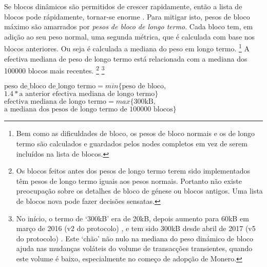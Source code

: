 Se blocos dinâmicos são permitidos de crescer rapidamente, então a lista de blocos pode rápidamente, tornar-se enorme \cite{big-bang-github}. Para mitigar isto, pesos de bloco máximo são amarrados por {\em pesos de bloco de longo termo}. Cada bloco tem, em adição ao seu peso normal, uma segunda métrica, que é calculada com base nos blocos anteriores. Ou seja é calculada a mediana do peso em longo termo.       
\footnote{Bem como as dificuldades de bloco, os pesos de bloco normais e os de longo termo são calculados e guardados pelos nodes completos em vez de serem incluídos na lista de blocos.}
A efectiva mediana de peso de longo termo está relacionada com a mediana dos 100000 blocos mais recentes. 
\footnote{Os blocos feitos antes dos pesos de longo termo terem sido implementados têm pesos de longo termo iguais aos pesos normais. Portanto não existe preocupação sobre os detalhes de bloco de génese ou blocos antigos. Uma lista de blocos nova pode fazer decisões sensatas.}    
\footnote{No início, o termo de `300kB' era de 20kB, depois aumento para 60kB em março de 2016 (v2 do protocolo) \cite{monero-0.9.3}, e tem sido 300kB desde abril de 2017 (v5 do protocolo) \cite{monero-v5}. Este `chão' não nulo na mediana do peso dinámico de bloco ajuda nas mudanças voláteis do volume de transacções transientes, quando este volume é baixo, especialmente no começo de adopção de Monero.}  

    $\textrm{peso\ de\_bloco\ de\_longo\ termo} = min\{\textrm{peso\ de\ bloco},$\\ $1.4*\textrm{a\ anterior\ efectiva\ mediana\ de\ longo\ termo}\}$\\
    $\textrm{efectiva\ mediana\ de\ longo\ termo} = max\{\textrm{300kB},$ \\
    $\textrm{a\ mediana\ dos\ pesos\ de\ longo\ termo\ de\ 100000\ blocos}\}$%

